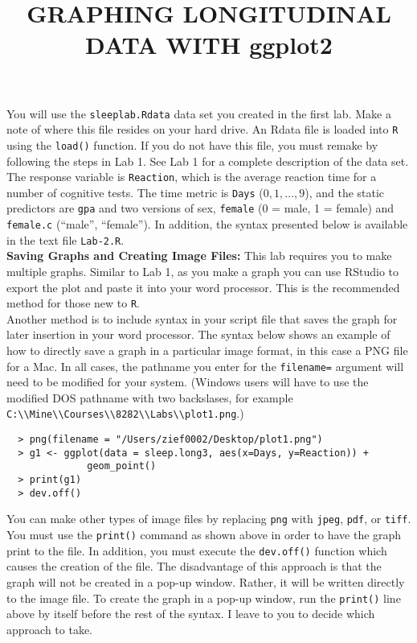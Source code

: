 \documentclass[]{article}
\title{GRAPHING LONGITUDINAL DATA WITH ggplot2}
\author{}
\date{}
\begin{document}
\maketitle 
\thispagestyle{fancy}

\noindent You will use the \texttt{sleeplab.Rdata} data set you created in the first lab. Make a note of where this file resides on your hard drive. An Rdata file is loaded into \texttt{R} using the \texttt{load()} function. If you do not have this file, you must remake by following the steps in Lab 1. See Lab 1 for a complete description of the data set. The response variable is \texttt{Reaction}, which is the average reaction time for a number of cognitive tests. The time metric is \texttt{Days} ($0,1,\ldots,9$), and the static predictors are \texttt{gpa} and two versions of sex, \texttt{female} (0 = male, 1 = female) and \texttt{female.c} (``male'',
``female''). In addition, the syntax presented below is available in the text file \texttt{Lab-2.R}.\\
\linebreak
\textbf{Saving Graphs and Creating Image Files:} This lab requires you to make multiple graphs. Similar to Lab 1, as you make a graph you can use RStudio to export the plot and paste it into your word processor. This is the recommended method for those new to \texttt{R}. \\
\linebreak
\noindent Another method is to include syntax in your script file that saves the graph for later
insertion in your word processor. The syntax below shows an example of how to directly save a graph in a particular image format, in this case a PNG file for a Mac. In all cases, the pathname you enter for the \texttt{filename=} argument will need to be modified for your system. (Windows users will have to use the modified DOS pathname with two backslases, for example \verb,C:\\Mine\\Courses\\8282\\Labs\\plot1.png,.)

\begin{verbatim}
  > png(filename = "/Users/zief0002/Desktop/plot1.png")
  > g1 <- ggplot(data = sleep.long3, aes(x=Days, y=Reaction)) + 
              geom_point()
  > print(g1)
  > dev.off()
\end{verbatim}

\noindent You can make other types of image files by replacing \texttt{png} with \texttt{jpeg}, \texttt{pdf}, or \texttt{tiff}. You must use the \texttt{print()} command as shown above in order to have the graph print to the file. In addition, you must execute the \texttt{dev.off()} function which causes the creation of the file. The disadvantage of this approach is that the graph will not be created in a pop-up window. Rather, it will be written directly to the image file. To create the graph in a pop-up window, run the \texttt{print()} line above by itself before the rest of the syntax. I leave to you to decide which approach to take.
\pagebreak
\end{document}
